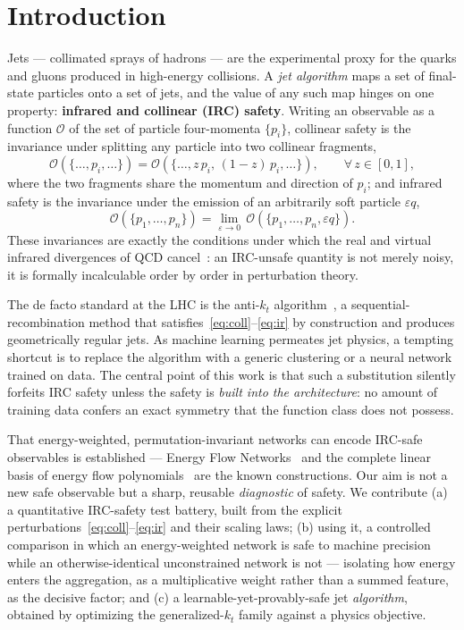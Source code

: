 \documentclass[11pt]{article}
\newcommand{\kt}{k_{t}}
\newcommand{\antikt}{anti-$\kt$}
\newcommand{\Obs}{\mathcal{O}}
\begin{document}
\section{Introduction}
Jets --- collimated sprays of hadrons --- are the experimental proxy for the quarks and
gluons produced in high-energy collisions. A \emph{jet algorithm} maps a set of
final-state particles onto a set of jets, and the value of any such map hinges on one
property: \textbf{infrared and collinear (IRC) safety}. Writing an observable as a
function $\Obs$ of the set of particle four-momenta $\{p_i\}$, collinear safety is the
invariance under splitting any particle into two collinear fragments,
\begin{equation}
\Obs\!\left(\{\dots,p_i,\dots\}\right)
= \Obs\!\left(\{\dots,z\,p_i,\,(1{-}z)\,p_i,\dots\}\right),
\qquad \forall\, z\in[0,1],
\label{eq:coll}
\end{equation}
where the two fragments share the momentum and direction of $p_i$; and infrared safety is
the invariance under the emission of an arbitrarily soft particle $\varepsilon q$,
\begin{equation}
\Obs\!\left(\{p_1,\dots,p_n\}\right)
= \lim_{\varepsilon\to 0}\, \Obs\!\left(\{p_1,\dots,p_n,\varepsilon q\}\right).
\label{eq:ir}
\end{equation}
These invariances are exactly the conditions under which the real and virtual infrared
divergences of QCD cancel~\cite{sterman,salam}: an IRC-unsafe quantity is not merely noisy,
it is formally incalculable order by order in perturbation theory.

The de facto standard at the LHC is the \antikt{} algorithm~\cite{antikt}, a
sequential-recombination method that satisfies~\eqref{eq:coll}--\eqref{eq:ir} by
construction and produces geometrically regular jets. As machine learning permeates jet
physics, a tempting shortcut is to replace the algorithm with a generic clustering or a
neural network trained on data. The central point of this work is that such a substitution
silently forfeits IRC safety unless the safety is \emph{built into the architecture}: no
amount of training data confers an exact symmetry that the function class does not possess.

That energy-weighted, permutation-invariant networks can encode IRC-safe observables is
established --- Energy Flow Networks~\cite{efn} and the complete linear basis of energy flow
polynomials~\cite{efp} are the known constructions. Our aim is not a new safe observable but
a sharp, reusable \emph{diagnostic} of safety. We contribute (a) a quantitative IRC-safety
test battery, built from the explicit perturbations~\eqref{eq:coll}--\eqref{eq:ir} and their
scaling laws; (b) using it, a controlled comparison in which an energy-weighted network is
safe to machine precision while an otherwise-identical unconstrained network is not ---
isolating how energy enters the aggregation, as a multiplicative weight rather than a summed
feature, as the decisive factor; and (c) a
learnable-yet-provably-safe jet \emph{algorithm}, obtained by optimizing the
generalized-$\kt$ family against a physics objective.
\end{document}
